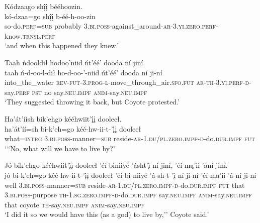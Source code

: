 \ea\label{ex:text4-6-7}
Kódzaago shį́į́ bééhoozin.\\
\gll kó-dzaa=go	shį́į́	b-éé-h-oo-zin\\
     so-do.\textsc{perf}=\textsc{sub}	probably	3.\textsc{bi}.\textsc{poss}-against\_around-\textsc{ar}-3.\textsc{yi}.\textsc{zero}.\textsc{perf}-know.\textsc{trnsl}.\textsc{perf}\\
\glt `and when this happened they knew.'
\z

\ea\label{ex:text4-6-8}
Taah ńdooldił hodoo’niid ńt’éé’ dooda ní jiní.\\
\gll taah	ń-d-oo-l-dił	ho-d-oo-’-niid	ńt’éé’	dooda	ní	ji-ní\\
     into\_the\_water	\textsc{rev}-\textsc{fut}-3.\textsc{prog}-\textsc{l}-move\_through\_air.\textsc{sfo}.\textsc{fut}	\textsc{ar}-\textsc{th}-3.\textsc{yi}.\textsc{perf}-\textsc{d}-say.\textsc{perf}	\textsc{pst}	no	say.\textsc{neu}.\textsc{impf}	\textsc{anim}-say.\textsc{neu}.\textsc{impf}\\
\glt `They suggested throwing it back, but Coyote protested.'
\z

\ea\label{ex:text4-6-9}
Ha’át’íísh bik’ehgo kééhwiit’į́į dooleeł.\\
\gll ha’át’íí=sh	bi-k’eh=go	kéé-hw-ii-t-’į́į	dooleeł\\
     what=\textsc{intrg}	3.\textsc{bi}.\textsc{poss}-manner=\textsc{sub}	reside-\textsc{ar}-1.\textsc{du}/\textsc{pl}.\textsc{zero}.\textsc{impf}-\textsc{d}-do.\textsc{dur}.\textsc{impf}	\textsc{fut}\\
\glt `{``}No, what will we have to live by?'
\z

\ea\label{ex:text4-6-10}
Jó bik’ehgo kééhwiit’į́į dooleeł ’éí biniiyé ’ásht’į́ ní jiní, ’éí mą’ii ’ání jiní.\\
\gll jó	bi-k’eh=go	kéé-hw-ii-t-’į́į	dooleeł	’éí	bi-niiyé	’á-sh-t-’į́	ní	ji-ní	’éí	mą’ii	’á-ní	ji-ní\\
     well	3.\textsc{bi}.\textsc{poss}-manner=\textsc{sub}	reside-\textsc{ar}-1.\textsc{du}/\textsc{pl}.\textsc{zero}.\textsc{impf}-\textsc{d}-do.\textsc{dur}.\textsc{impf}	\textsc{fut}	that	3.\textsc{bi}.\textsc{poss}-purpose	\textsc{th}-1.\textsc{sg}.\textsc{zero}.\textsc{impf}-\textsc{d}-do.\textsc{dur}.\textsc{impf}	say.\textsc{neu}.\textsc{impf}	\textsc{anim}-say.\textsc{neu}.\textsc{impf}	that	coyote	\textsc{th}-say.\textsc{neu}.\textsc{impf}	\textsc{anim}-say.\textsc{neu}.\textsc{impf}\\
\glt `I did it so we would have this (as a god) to live by,'' Coyote said.'
\z


